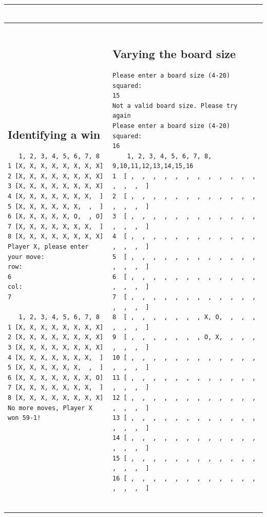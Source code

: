 \documentclass[a4wide, 11pt]{article}
\begin{document}
\begin{center}
\begin{tabular}{ | l | l |}
\begin{minipage}{85mm}
\begin{scriptsize}
\begin{verbatim}
          \end{verbatim}
        \end{scriptsize}
      \end{minipage}
      \\
      \hline
      \begin{minipage}{85mm}
      \tiny{\begin{verbatim} \end{verbatim}}
      \subsection{Identifying a win}
        \begin{scriptsize}
          \begin{verbatim}
   1, 2, 3, 4, 5, 6, 7, 8 
1 [X, X, X, X, X, X, X, X]
2 [X, X, X, X, X, X, X, X]
3 [X, X, X, X, X, X, X, X]
4 [X, X, X, X, X, X, X,  ]
5 [X, X, X, X, X, X,  ,  ]
6 [X, X, X, X, X, O,  , O]
7 [X, X, X, X, X, X, X,  ]
8 [X, X, X, X, X, X, X, X]
Player X, please enter your move:
row: 
6
col: 
7

   1, 2, 3, 4, 5, 6, 7, 8 
1 [X, X, X, X, X, X, X, X]
2 [X, X, X, X, X, X, X, X]
3 [X, X, X, X, X, X, X, X]
4 [X, X, X, X, X, X, X,  ]
5 [X, X, X, X, X, X,  ,  ]
6 [X, X, X, X, X, X, X, O]
7 [X, X, X, X, X, X, X,  ]
8 [X, X, X, X, X, X, X, X]
No more moves, Player X won 59-1!
          \end{verbatim}
        \end{scriptsize}
      \end{minipage}
      &
      \begin{minipage}{85mm}
      \tiny{\begin{verbatim} \end{verbatim}}
      \subsection{Varying the board size}
        \begin{scriptsize}
          \begin{verbatim}
Please enter a board size (4-20) squared:
15
Not a valid board size. Please try again
Please enter a board size (4-20) squared:
16      
    1, 2, 3, 4, 5, 6, 7, 8, 9,10,11,12,13,14,15,16 
1  [ ,  ,  ,  ,  ,  ,  ,  ,  ,  ,  ,  ,  ,  ,  ,  ]
2  [ ,  ,  ,  ,  ,  ,  ,  ,  ,  ,  ,  ,  ,  ,  ,  ]
3  [ ,  ,  ,  ,  ,  ,  ,  ,  ,  ,  ,  ,  ,  ,  ,  ]
4  [ ,  ,  ,  ,  ,  ,  ,  ,  ,  ,  ,  ,  ,  ,  ,  ]
5  [ ,  ,  ,  ,  ,  ,  ,  ,  ,  ,  ,  ,  ,  ,  ,  ]
6  [ ,  ,  ,  ,  ,  ,  ,  ,  ,  ,  ,  ,  ,  ,  ,  ]
7  [ ,  ,  ,  ,  ,  ,  ,  ,  ,  ,  ,  ,  ,  ,  ,  ]
8  [ ,  ,  ,  ,  ,  ,  , X, O,  ,  ,  ,  ,  ,  ,  ]
9  [ ,  ,  ,  ,  ,  ,  , O, X,  ,  ,  ,  ,  ,  ,  ]
10 [ ,  ,  ,  ,  ,  ,  ,  ,  ,  ,  ,  ,  ,  ,  ,  ]
11 [ ,  ,  ,  ,  ,  ,  ,  ,  ,  ,  ,  ,  ,  ,  ,  ]
12 [ ,  ,  ,  ,  ,  ,  ,  ,  ,  ,  ,  ,  ,  ,  ,  ]
13 [ ,  ,  ,  ,  ,  ,  ,  ,  ,  ,  ,  ,  ,  ,  ,  ]
14 [ ,  ,  ,  ,  ,  ,  ,  ,  ,  ,  ,  ,  ,  ,  ,  ]
15 [ ,  ,  ,  ,  ,  ,  ,  ,  ,  ,  ,  ,  ,  ,  ,  ]
16 [ ,  ,  ,  ,  ,  ,  ,  ,  ,  ,  ,  ,  ,  ,  ,  ]


\end{verbatim}
\end{scriptsize}
\end{minipage}
\end{tabular}
\end{center}
\end{document}
